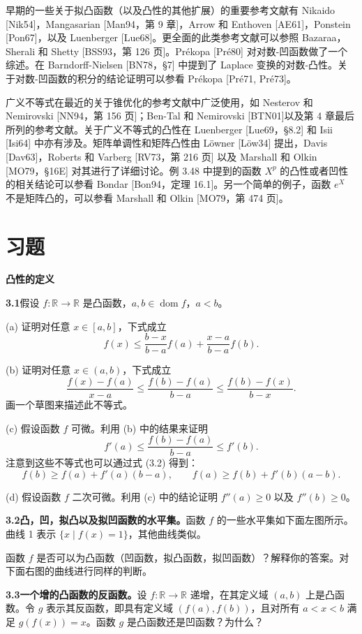 \documentclass[UTF8, 12pt, fontset=fandol, oneside]{ctexart}
\DeclareMathOperator{\dom}{dom}
\begin{document}
早期的一些关于拟凸函数（以及凸性的其他扩展）的重要参考文献有 Nikaido [Nik54]，Mangasarian [Man94，第 9 章]，Arrow 和 Enthoven [AE61]，Ponstein [Pon67]，以及 Luenberger [Lue68]。更全面的此类参考文献可以参照 Bazaraa，Sherali 和 Shetty [BSS93，第 126 页]。Prékopa [Pré80] 对对数-凹函数做了一个综述。在 Barndorff-Nielsen [BN78，\S7] 中提到了 Laplace 变换的对数-凸性。关于对数-凹函数的积分的结论证明可以参看 Prékopa [Pré71, Pré73]。

广义不等式在最近的关于锥优化的参考文献中广泛使用，如 Nesterov 和 Nemirovski [NN94，第 156 页]；Ben-Tal 和 Nemirovski [BTN01]以及第 4 章最后所列的参考文献。关于广义不等式的凸性在 Luenberger [Lue69，\S8.2] 和 Isii [Isi64] 中亦有涉及。矩阵单调性和矩阵凸性由 Löwner [Löw34] 提出，Davis [Dav63]，Roberts 和 Varberg [RV73，第 216 页] 以及 Marshall 和 Olkin [MO79，\S16E] 对其进行了详细讨论。例 3.48 中提到的函数 $X^p$ 的凸性或者凹性的相关结论可以参看 Bondar [Bon94，定理 16.1]。另一个简单的例子，函数 $e^X$ 不是矩阵凸的，可以参看 Marshall 和 Olkin [MO79，第 474 页]。

\section*{习题}

\noindent\textbf{凸性的定义}

\noindent\textbf{3.1}\quad 假设 $f:\mathbb{R}\to\mathbb{R}$ 是凸函数，$a,b\in\dom f$，$a<b$。

(a) 证明对任意 $x\in[a,b]$，下式成立
\[
f(x)\leq \frac{b-x}{b-a}f(a)+\frac{x-a}{b-a}f(b).
\]

(b) 证明对任意 $x\in(a,b)$，下式成立
\[
\frac{f(x)-f(a)}{x-a}\leq \frac{f(b)-f(a)}{b-a}\leq \frac{f(b)-f(x)}{b-x}.
\]
画一个草图来描述此不等式。

(c) 假设函数 $f$ 可微。利用 (b) 中的结果来证明
\[
f'(a)\leq \frac{f(b)-f(a)}{b-a}\leq f'(b).
\]
注意到这些不等式也可以通过式 (3.2) 得到：
\[
f(b)\geq f(a)+f'(a)(b-a),\qquad
f(a)\geq f(b)+f'(b)(a-b).
\]

(d) 假设函数 $f$ 二次可微。利用 (c) 中的结论证明 $f''(a)\geq0$ 以及 $f''(b)\geq0$。

\noindent\textbf{3.2\quad 凸，凹，拟凸以及拟凹函数的水平集。}\quad 函数 $f$ 的一些水平集如下面左图所示。曲线 1 表示 $\{x\mid f(x)=1\}$，其他曲线类似。

函数 $f$ 是否可以为凸函数（凹函数，拟凸函数，拟凹函数）？解释你的答案。对下面右图的曲线进行同样的判断。

\noindent\textbf{3.3\quad 一个增的凸函数的反函数。}\quad 设 $f:\mathbb{R}\to\mathbb{R}$ 递增，在其定义域 $(a,b)$ 上是凸函数。令 $g$ 表示其反函数，即具有定义域 $(f(a),f(b))$，且对所有 $a<x<b$ 满足 $g(f(x))=x$。函数 $g$ 是凸函数还是凹函数？为什么？
\end{document}
